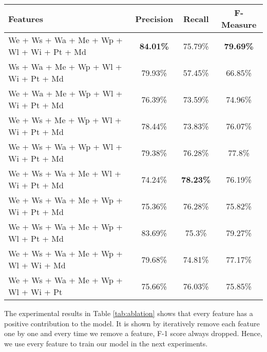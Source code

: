 \begin{table*}
	\caption{Feature Ablation Study Result}
	\label{tab:ablation}
	\begin{tabular}{lccc}
		\toprule
		Features&Precision&Recall&F-Measure\\
		\midrule
		We + Ws + Wa + Me + Wp + Wl + Wi + Pt + Md & \textbf{84.01\%} & 75.79\% & \textbf{79.69\%} \\
		
		Ws + Wa + Me + Wp + Wl + Wi + Pt + Md & 79.93\% & 57.45\% & 66.85\% \\
		
		We + Wa + Me + Wp + Wl + Wi + Pt + Md & 76.39\% & 73.59\% & 74.96\% \\
		
		We + Ws + Me + Wp + Wl + Wi + Pt + Md & 78.44\% & 73.83\% & 76.07\% \\
		
		We + Ws + Wa + Wp + Wl + Wi + Pt + Md & 79.38\% & 76.28\% & 77.8\% \\
		
		We + Ws + Wa + Me + Wl + Wi + Pt + Md & 74.24\% & \textbf{78.23\%} & 76.19\% \\
		
		We + Ws + Wa + Me + Wp + Wi + Pt + Md & 75.36\% & 76.28\% & 75.82\% \\
		
		We + Ws + Wa + Me + Wp + Wl + Pt + Md & 83.69\% & 75.3\% & 79.27\% \\
		
		We + Ws + Wa + Me + Wp + Wl + Wi + Md & 79.68\% & 74.81\% & 77.17\% \\
		
		We + Ws + Wa + Me + Wp + Wl + Wi + Pt & 75.66\% & 76.03\% & 75.85\% \\
		\bottomrule
	\end{tabular}
\end{table*}


The experimental results in Table \ref{tab:ablation} shows that every feature has a positive contribution to the model. It is shown by iteratively remove each feature one by one and every time we remove a feature, F-1 score always dropped. Hence, we use every feature to train our model in the next experiments.
